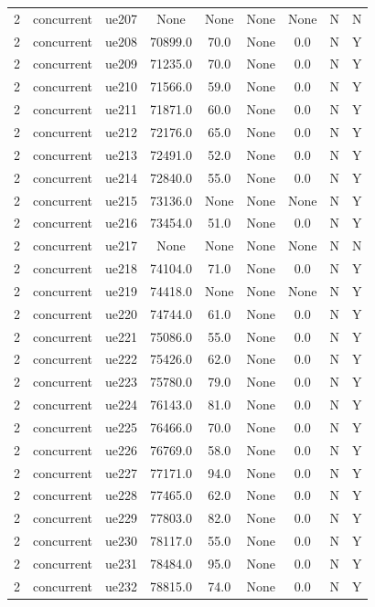 \begin{table}[ht]
\begin{tabular}{|c|c|c|c|c|c|c|c|c|}
2 & concurrent & ue207 & None & None & None & None & N & N \\
2 & concurrent & ue208 & 70899.0 & 70.0 & None & 0.0 & N & Y \\
2 & concurrent & ue209 & 71235.0 & 70.0 & None & 0.0 & N & Y \\
2 & concurrent & ue210 & 71566.0 & 59.0 & None & 0.0 & N & Y \\
2 & concurrent & ue211 & 71871.0 & 60.0 & None & 0.0 & N & Y \\
2 & concurrent & ue212 & 72176.0 & 65.0 & None & 0.0 & N & Y \\
2 & concurrent & ue213 & 72491.0 & 52.0 & None & 0.0 & N & Y \\
2 & concurrent & ue214 & 72840.0 & 55.0 & None & 0.0 & N & Y \\
2 & concurrent & ue215 & 73136.0 & None & None & None & N & Y \\
2 & concurrent & ue216 & 73454.0 & 51.0 & None & 0.0 & N & Y \\
2 & concurrent & ue217 & None & None & None & None & N & N \\
2 & concurrent & ue218 & 74104.0 & 71.0 & None & 0.0 & N & Y \\
2 & concurrent & ue219 & 74418.0 & None & None & None & N & Y \\
2 & concurrent & ue220 & 74744.0 & 61.0 & None & 0.0 & N & Y \\
2 & concurrent & ue221 & 75086.0 & 55.0 & None & 0.0 & N & Y \\
2 & concurrent & ue222 & 75426.0 & 62.0 & None & 0.0 & N & Y \\
2 & concurrent & ue223 & 75780.0 & 79.0 & None & 0.0 & N & Y \\
2 & concurrent & ue224 & 76143.0 & 81.0 & None & 0.0 & N & Y \\
2 & concurrent & ue225 & 76466.0 & 70.0 & None & 0.0 & N & Y \\
2 & concurrent & ue226 & 76769.0 & 58.0 & None & 0.0 & N & Y \\
2 & concurrent & ue227 & 77171.0 & 94.0 & None & 0.0 & N & Y \\
2 & concurrent & ue228 & 77465.0 & 62.0 & None & 0.0 & N & Y \\
2 & concurrent & ue229 & 77803.0 & 82.0 & None & 0.0 & N & Y \\
2 & concurrent & ue230 & 78117.0 & 55.0 & None & 0.0 & N & Y \\
2 & concurrent & ue231 & 78484.0 & 95.0 & None & 0.0 & N & Y \\
2 & concurrent & ue232 & 78815.0 & 74.0 & None & 0.0 & N & Y \\

\end{tabular}
\end{table}
